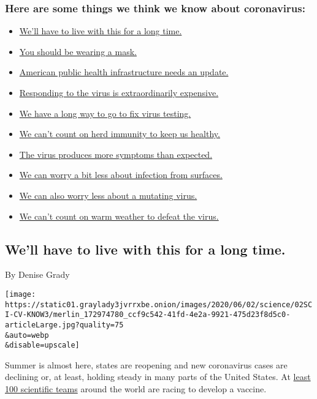 \hypertarget{here-are-some-things-we-think-we-know-about-coronavirus}{%
\subsubsection{Here are some things we think we know about
coronavirus:}\label{here-are-some-things-we-think-we-know-about-coronavirus}}

\begin{itemize}
\tightlist
\item
  \protect\hyperlink{link-2ee4ffe7}{We'll have to live with this for a
  long time.}
\item
  \protect\hyperlink{link-6ec3dc3a}{You should be wearing a mask.}
\item
  \protect\hyperlink{link-5d80e42a}{American public health
  infrastructure needs an update.}
\item
  \protect\hyperlink{link-1437f014}{Responding to the virus is
  extraordinarily expensive.}
\item
  \protect\hyperlink{link-1da03d75}{We have a long way to go to fix
  virus testing.}
\item
  \protect\hyperlink{link-16ac6f7f}{We can't count on herd immunity to
  keep us healthy.}
\item
  \protect\hyperlink{link-6817bab5}{The virus produces more symptoms
  than expected.}
\item
  \protect\hyperlink{link-52bb8dd1}{We can worry a bit less about
  infection from surfaces.}
\item
  \protect\hyperlink{link-10fd5d3e}{We can also worry less about a
  mutating virus.}
\item
  \protect\hyperlink{link-34a1dcc4}{We can't count on warm weather to
  defeat the virus.}
\end{itemize}

\hypertarget{well-have-to-live-with-this-for-a-long-time}{%
\subsection{We'll have to live with this for a long
time.}\label{well-have-to-live-with-this-for-a-long-time}}

By Denise Grady

\texttt{[image: https://static01.graylady3jvrrxbe.onion/images/2020/06/02/science/02SCI-CV-KNOW3/merlin\_172974780\_ccf9c542-41fd-4e2a-9921-475d23f8d5c0-articleLarge.jpg?quality=75\\\&auto=webp\\\&disable=upscale]}

Summer is almost here, states are reopening and new coronavirus cases
are declining or, at least, holding steady in many parts of the United
States. At
\href{https://www.nytimes3xbfgragh.onion/interactive/2020/05/20/science/coronavirus-vaccine-development.html?searchResultPosition=6}{least
100 scientific teams} around the world are racing to develop a vaccine.

